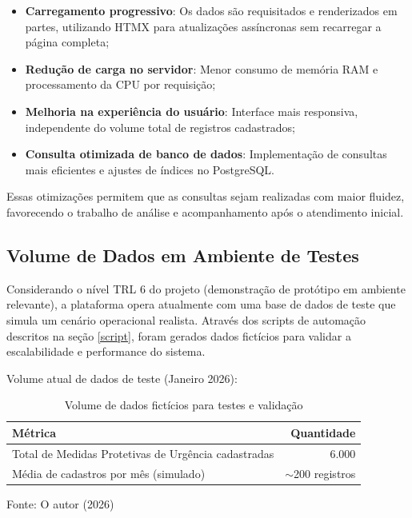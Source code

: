 \begin{itemize}
    \item \textbf{Carregamento progressivo}: Os dados são requisitados e renderizados em partes, utilizando HTMX para atualizações assíncronas sem recarregar a página completa;
    \item \textbf{Redução de carga no servidor}: Menor consumo de memória RAM e processamento da CPU por requisição;
    \item \textbf{Melhoria na experiência do usuário}: Interface mais responsiva, independente do volume total de registros cadastrados;
    \item \textbf{Consulta otimizada de banco de dados}: Implementação de consultas mais eficientes e ajustes de índices no PostgreSQL.
\end{itemize}

\par Essas otimizações permitem que as consultas sejam realizadas com maior fluidez, favorecendo o trabalho de análise e acompanhamento após o atendimento inicial.

\subsection{Volume de Dados em Ambiente de Testes}
\par Considerando o nível TRL 6 do projeto (demonstração de protótipo em ambiente relevante), a plataforma opera atualmente com uma base de dados de teste que simula um cenário operacional realista. Através dos scripts de automação descritos na seção \ref{script}, foram gerados dados fictícios para validar a escalabilidade e performance do sistema.

\par Volume atual de dados de teste (Janeiro 2026):

\begin{table}[H]
\centering
\caption{Volume de dados fictícios para testes e validação}
\begin{tabular}{|l|r|}
\hline
\textbf{Métrica} & \textbf{Quantidade} \\
\hline
Total de Medidas Protetivas de Urgência cadastradas & 6.000 \\
\hline
Média de cadastros por mês (simulado) & $\sim$200 registros \\
\hline
\end{tabular}
\label{tab:volume_dados}

{\fontsize{10pt}{\baselineskip}\selectfont
    Fonte: O autor (2026)}
\end{table}

